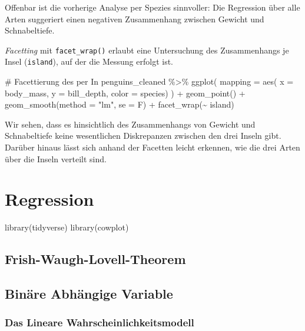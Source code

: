 \documentclass[
  a4paper,
  DIV=11,
  oneside]{scrreprt}
\newenvironment{Shaded}{\begin{snugshade}}{\end{snugshade}}
\newcommand{\FunctionTok}[1]{\textcolor[rgb]{0.28,0.35,0.67}{#1}}
\newcommand{\NormalTok}[1]{\textcolor[rgb]{0.00,0.23,0.31}{#1}}
\begin{document}
Offenbar ist die vorherige Analyse per Spezies sinnvoller: Die
Regression über alle Arten suggeriert einen negativen Zusammenhang
zwischen Gewicht und Schnabeltiefe.

\emph{Facetting} mit \texttt{facet\_wrap()} erlaubt eine Untersuchung
des Zusammenhangs je Insel (\texttt{island}), auf der die Messung
erfolgt ist.

\begin{Shaded}
\begin{Highlighting}[]
\NormalTok{\# Facettierung des per In}
\NormalTok{penguins\_cleaned \%\textgreater{}\%}
\NormalTok{  ggplot(}
\NormalTok{    mapping = aes(}
\NormalTok{      x = body\_mass, }
\NormalTok{      y = bill\_depth, }
\NormalTok{      color = species)}
\NormalTok{  ) +}
\NormalTok{  geom\_point() +}
\NormalTok{  geom\_smooth(method = "lm", se = F) +}
\NormalTok{  facet\_wrap(\textasciitilde{} island)}
\end{Highlighting}
\end{Shaded}

Wir sehen, dass es hinsichtlich des Zusammenhangs von Gewicht und
Schnabeltiefe keine wesentlichen Diskrepanzen zwischen den drei Inseln
gibt. Darüber hinaus lässt sich anhand der Facetten leicht erkennen, wie
die drei Arten über die Inseln verteilt sind.


\chapter{Regression}\label{sec-regression}

\begin{Shaded}
\begin{Highlighting}[]
\FunctionTok{library}\NormalTok{(tidyverse)}
\FunctionTok{library}\NormalTok{(cowplot)}
\end{Highlighting}
\end{Shaded}

\section{Frish-Waugh-Lovell-Theorem}\label{frish-waugh-lovell-theorem}

\section{Binäre Abhängige
Variable}\label{binuxe4re-abhuxe4ngige-variable}

\subsection{Das Lineare Wahrscheinlichkeitsmodell}\label{sec-lpm}
\end{document}
